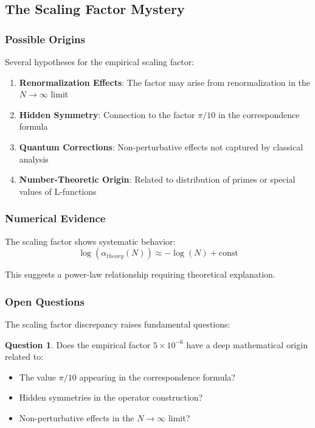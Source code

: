 \documentclass[12pt,letterpaper]{article}
\theoremstyle{plain}
\theoremstyle{definition}
\newtheorem{question}[theorem]{Question}
\theoremstyle{remark}
\begin{document}
\subsection{The Scaling Factor Mystery}

\subsubsection{Possible Origins}

Several hypotheses for the empirical scaling factor:

\begin{enumerate}
\item \textbf{Renormalization Effects}: The factor may arise from renormalization in the $N \to \infty$ limit

\item \textbf{Hidden Symmetry}: Connection to the factor $\pi/10$ in the correspondence formula

\item \textbf{Quantum Corrections}: Non-perturbative effects not captured by classical analysis

\item \textbf{Number-Theoretic Origin}: Related to distribution of primes or special values of L-functions
\end{enumerate}

\subsubsection{Numerical Evidence}

The scaling factor shows systematic behavior:
\begin{equation}
\log(\alpha_{theory}(N)) \approx -\log(N) + \text{const}
\end{equation}

This suggests a power-law relationship requiring theoretical explanation.

\subsubsection{Open Questions}

The scaling factor discrepancy raises fundamental questions:

\begin{question}
Does the empirical factor $5 \times 10^{-6}$ have a deep mathematical origin related to:
\begin{itemize}
\item The value $\pi/10$ appearing in the correspondence formula?
\item Hidden symmetries in the operator construction?
\item Non-perturbative effects in the $N \to \infty$ limit?
\end{itemize}
\end{question}
\end{document}
